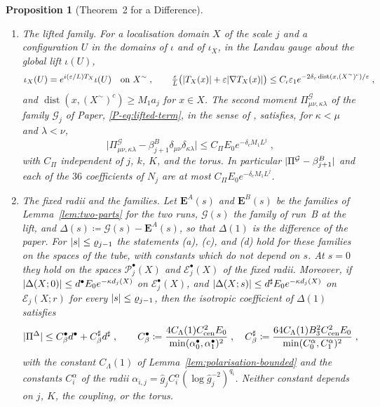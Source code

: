 \documentclass[11pt]{preprint}
\newcommand{\dist}{\operatorname{dist}}
\DeclarePairedDelimiter{\abs}{\lvert}{\rvert}
\numberwithin{equation}{section}
\newtheorem{proposition}{Proposition}
\theoremstyle{definition}
\theoremstyle{remark}
\theoremstyle{plain}
\begin{document}
\begin{proposition}[Theorem~2 for a Difference]
\begin{enumerate}[label=(\alph*)]
\item \emph{The lifted family.} For a localisation domain $X$ of the scale $j$ and a configuration $U$ in the domains of $\iota$ and of $\iota_X$, in the Landau gauge about the global lift $\iota(U)$,
\begin{equation}\label{eq:lift-tail}
    \iota_X(U) = e^{i(\varepsilon/L)T_X}\iota(U) \quad\text{on } X^\sim\;,
    \qquad
    \tfrac{\varepsilon}{L}\bigl(\abs{T_X(x)} + \varepsilon\abs{\nabla T_X(x)}\bigr) \leq C_\iota\varepsilon_1e^{-2\delta_c\dist(x, (X^\sim)^c)/\varepsilon}\;,
\end{equation}
and $\dist(x, (X^\sim)^c) \geq M_1a_j$ for $x \in X$. The second moment $\Pi^{\mathcal G}_{\mu\nu,\kappa\lambda}$ of the family $\mathcal G_j$ of Paper, \eqref{P-eq:lifted-term}, in the sense of \cite[(3.57), p.~281]{BalabanCRE}, satisfies, for $\kappa < \mu$ and $\lambda < \nu$,
\begin{equation}\label{eq:lifted-moments}
    \bigl\lvert\Pi^{\mathcal G}_{\mu\nu,\kappa\lambda} - \beta^B_{j+1}\delta_{\mu\nu}\delta_{\kappa\lambda}\bigr\rvert \leq C_\Pi E_0e^{-\delta_cM_1L^j}\;,
\end{equation}
with $C_\Pi$ independent of $j$, $k$, $K$, and the torus. In particular $\abs{\Pi^{\mathcal G} - \beta^B_{j+1}}$ and each of the $36$ coefficients of $N_j$ are at most $C_\Pi E_0e^{-\delta_cM_1L^j}$.
\item \emph{The fixed radii and the families.} Let $\mathbf E^A(s)$ and $\mathbf E^B(s)$ be the families of Lemma~\ref{lem:two-parts} for the two runs, $\mathcal G(s)$ the family of run~B at the lift, and $\Delta(s) \coloneqq \mathcal G(s) - \mathbf E^A(s)$, so that $\Delta(1)$ is the difference of the paper. For $\abs s \leq \varrho_{j-1}$ the statements (a), (c), and (d) hold for these families on the spaces of the tube, with constants which do not depend on $s$. At $s = 0$ they hold on the spaces $\mathcal P^\bullet_j(X)$ and $\mathcal E^\bullet_j(X)$ of the fixed radii. Moreover, if $\abs{\Delta(X; 0)} \leq d^\bullet E_0e^{-\kappa d_j(X)}$ on $\mathcal E^\bullet_j(X)$, and $\abs{\Delta(X; s)} \leq d^\sharp E_0e^{-\kappa d_j(X)}$ on $\mathcal E_j(X; r)$ for every $\abs s \leq \varrho_{j-1}$, then the isotropic coefficient of $\Delta(1)$ satisfies
\begin{equation}\label{eq:coefficient-two-norms}
    \abs{\Pi^\Delta} \leq C^\bullet_\beta d^\bullet + C^\sharp_\beta d^\sharp\;,
    \qquad
    C^\bullet_\beta \coloneqq \frac{4C_\Lambda(1)C_{\mathrm{cen}}^2E_0}{\min(\alpha^\bullet_0, \alpha^\bullet_1)^2}\;,
    \quad
    C^\sharp_\beta \coloneqq \frac{64C_\Lambda(1)B_3^2C_{\mathrm{cen}}^2E_0}{\min(C^\alpha_0, C^\alpha_1)^2}\;,
\end{equation}
with the constant $C_\Lambda(1)$ of Lemma~\ref{lem:polarisation-bounded} and the constants $C^\alpha_i$ of the radii $\alpha_{i,j} = \hat g_jC^\alpha_i(\log\hat g_j^{-2})^{q_i}$. Neither constant depends on $j$, $K$, the coupling, or the torus.
\end{enumerate}
\end{proposition}
\end{document}
